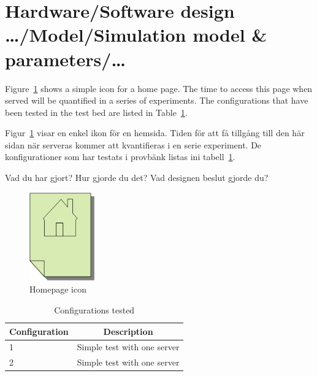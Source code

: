\documentclass[english]{kththesis}
\newenvironment{swedishnotes}%
  {\begin{center}
      \selectlanguage{swedish}
      \color{blue}}%
    {\end{center}
    \selectlanguage{USenglish}}
\begin{document}
\section{Hardware/Software design …/Model/Simulation model \& parameters/…}

Figure~\ref{fig:homepageicon} shows a simple icon for a home page. The time
to access this page when served will be quantified in a series of
experiments. The configurations that have been tested in the test bed are
listed in Table~\ref{tab:configstested}.

\begin{swedishnotes}
Figur~\ref{fig:homepageicon}  visar en enkel ikon för en hemsida. Tiden för att få tillgång till den här sidan när serveras kommer att kvantifieras i en serie experiment. De konfigurationer som har testats i provbänk listas ini tabell~\ref{tab:configstested}.

Vad du har gjort? Hur gjorde du det? Vad designen beslut gjorde du?
\end{swedishnotes}
 
\begin{figure}[!h]
  \begin{center}
    \includegraphics[width=0.25\textwidth]{Homepage-icon.png}
  \end{center}
  \caption{Homepage icon}
  \label{fig:homepageicon}
\end{figure}

\begin{table}[!ht]
  \begin{center}
    \caption{Configurations tested}
    \label{tab:configstested}
    \begin{tabular}{l|c} %
      \textbf{Configuration} & \textbf{Description} \\
      \hline
      1 & Simple test with one server\\
      2 & Simple test with one server\\
    \end{tabular}
  \end{center}
\end{table}
\end{document}
